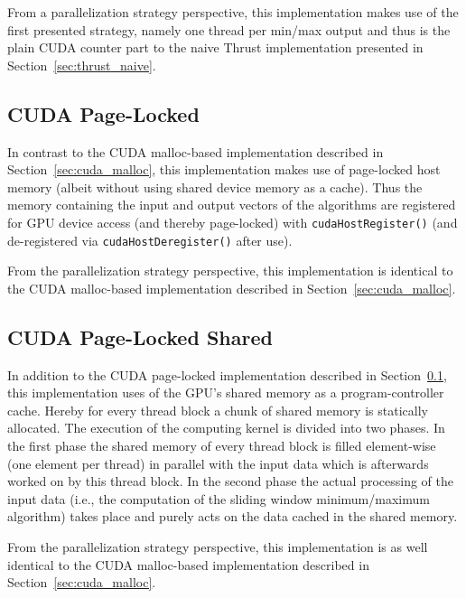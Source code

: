 From a parallelization strategy perspective, this implementation makes use of the first presented strategy, namely one thread per min/max output and thus is the plain CUDA counter part to the naive Thrust implementation presented in Section~\ref{sec:thrust_naive}.

\subsection{CUDA Page-Locked}
\label{sec:cuda_page_locked}
In contrast to the CUDA malloc-based implementation described in Section~\ref{sec:cuda_malloc}, this implementation makes use of page-locked host memory (albeit without using shared device memory as a cache). Thus the memory containing the input and output vectors of the algorithms are registered for GPU device access (and thereby page-locked) with \texttt{cudaHostRegister()} (and de-registered via \texttt{cudaHostDeregister()} after use).

From the parallelization strategy perspective, this implementation is identical to the CUDA malloc-based implementation described in Section~\ref{sec:cuda_malloc}.

\subsection{CUDA Page-Locked Shared}
In addition to the CUDA page-locked implementation described in Section~\ref{sec:cuda_page_locked}, this implementation uses of the GPU's shared memory as a program-controller cache. Hereby for every thread block a chunk of shared memory is statically allocated. The execution of the computing kernel is divided into two phases. In the first phase the shared memory of every thread block is filled element-wise (one element per thread) in parallel with the input data which is afterwards worked on by this thread block. In the second phase the actual processing of the input data (i.e., the computation of the sliding window minimum/maximum algorithm) takes place and purely acts on the data cached in the shared memory.

From the parallelization strategy perspective, this implementation is as well identical to the CUDA malloc-based implementation described in Section~\ref{sec:cuda_malloc}.

